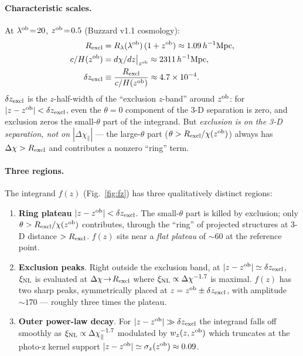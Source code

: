 \documentclass[11pt]{article}
\newcommand{\lob}{\lambda^{\rm ob}}
\newcommand{\zob}{z^{\rm ob}}
\newcommand{\xinl}{\xi_{\rm NL}}
\newcommand{\hMpc}{h^{-1}\text{Mpc}}
\begin{document}
\paragraph{Characteristic scales.}
At \(\lob\!=\!20\), \(\zob\!=\!0.5\) (Buzzard v1.1 cosmology):
\begin{align}
R_{\rm excl} &= R_\lambda(\lob)\,(1+\zob) \approx 1.09\,\hMpc,\\
c/H(\zob) &= d\chi/dz\big|_{\zob} \approx 2311\,\hMpc,\\
\delta z_{\rm excl} &\equiv \frac{R_{\rm excl}}{c/H(\zob)}
                     \approx 4.7\times 10^{-4}.
\end{align}
\(\delta z_{\rm excl}\) is the \(z\)-half-width of the ``exclusion
\(z\)-band'' around \(\zob\): for
\(|z-\zob|<\delta z_{\rm excl}\), even the \(\theta\!=\!0\)
component of the 3-D separation is zero, and exclusion zeros the
small-\(\theta\) part of the integrand. But \emph{exclusion is on
the 3-D separation, not on \(|\Delta\chi_\parallel|\)} --- the
large-\(\theta\) part (\(\theta>R_{\rm excl}/\chi(\zob)\)) always
has \(\Delta\chi>R_{\rm excl}\) and contributes a nonzero ``ring''
term.

\paragraph{Three regions.}
The integrand \(f(z)\) (Fig.~\ref{fig:fz}) has three
qualitatively distinct regions:
\begin{enumerate}
  \item[{\bf R1.}]
    \textbf{Ring plateau} \(|z-\zob|<\delta z_{\rm excl}\). The
    small-\(\theta\) part is killed by exclusion; only
    \(\theta>R_{\rm excl}/\chi(\zob)\) contributes, through the
    ``ring'' of projected structures at 3-D distance
    \(>R_{\rm excl}\). \(f(z)\) sits near a
    \emph{flat plateau} of \(\sim\!60\) at the reference point.

  \item[{\bf R2.}]
    \textbf{Exclusion peaks}. Right outside the exclusion band,
    at \(|z-\zob|\simeq\delta z_{\rm excl}\), \(\xinl\) is evaluated
    at \(\Delta\chi\!\to\!R_{\rm excl}\) where
    \(\xinl\propto\Delta\chi^{-1.7}\) is maximal. \(f(z)\) has two
    sharp peaks, symmetrically placed at
    \(z=\zob\pm\delta z_{\rm excl}\), with amplitude
    \(\sim\!170\) --- roughly three times the plateau.

  \item[{\bf R3.}]
    \textbf{Outer power-law decay}. For
    \(|z-\zob|\gg\delta z_{\rm excl}\) the integrand falls off
    smoothly as \(\xinl\propto\Delta\chi_\parallel^{-1.7}\) modulated
    by \(w_z(z,\zob)\) which truncates at the photo-z kernel
    support \(|z-\zob|\simeq\sigma_z(\zob)\approx 0.09\).
\end{enumerate}
\end{document}
